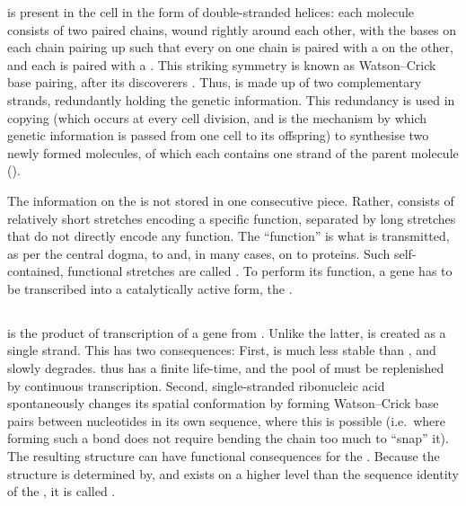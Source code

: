 \dna is present in the cell in the form of double-stranded helices: each \dna
molecule consists of two paired chains, wound rightly around each other, with
the bases on each chain pairing up such that every \nA on one chain is paired
with a \nT on the other, and each \nC is paired with a \nG. This striking
symmetry is known as Watson–Crick base pairing, after its discoverers
\citep{Watson:1953}. Thus, \dna is made up of two complementary strands,
redundantly holding the genetic information. This redundancy is used in \dna
copying (which occurs at every cell division, and is the mechanism by which
genetic information is passed from one cell to its offspring) to synthesise two
newly formed \dna molecules, of which each contains one strand of the parent
\dna molecule ().

The information on the \dna is not stored in one consecutive piece. Rather, \dna
consists of relatively short stretches encoding a specific function, separated
by long stretches that do not directly encode any function. The “function” is
what is transmitted, as per the central dogma, to \rna and, in many cases, on to
proteins. Such self-contained, functional stretches are called
. To perform its function, a gene has
to be transcribed into a catalytically active form, the \rna.

\subsection{}

\rna is the product of transcription of a gene from \dna. Unlike the latter,
\rna is created as a single strand. This has two consequences: First, \rna is
much less stable than \dna, and slowly degrades. \rna thus has a finite
life-time, and the pool of \rna must be replenished by continuous transcription.
Second, single-stranded ribonucleic acid spontaneously changes its spatial
conformation by forming Watson--Crick base pairs between nucleotides in its own
sequence, where this is  possible (i.e.\ where forming such a bond
does not require bending the chain too much to “snap” it). The resulting
structure can have functional consequences for the \rna. Because the structure
is determined by, and exists on a higher level than the sequence identity of the
\rna, it is called .

